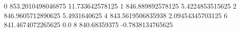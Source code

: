 0 853.2010498046875 11.733642578125
1 846.889892578125 5.4224853515625
2 846.9605712890625 5.4931640625
4 843.5619506835938 2.09454345703125
6 841.4674072265625 0.0
8 840.68359375 -0.7838134765625
